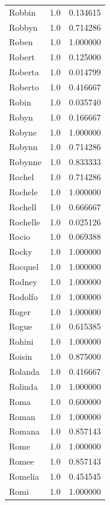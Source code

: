 \documentclass[
  letterpaper,
  DIV=11,
  numbers=noendperiod]{scrreprt}
\begin{document}
\begin{tabular}{lrr}
Robbin          &   1.0 &   0.134615 \\
Robbyn          &   1.0 &   0.714286 \\
Roben           &   1.0 &   1.000000 \\
Robert          &   1.0 &   0.125000 \\
Roberta         &   1.0 &   0.014799 \\
Roberto         &   1.0 &   0.416667 \\
Robin           &   1.0 &   0.035740 \\
Robyn           &   1.0 &   0.166667 \\
Robyne          &   1.0 &   1.000000 \\
Robynn          &   1.0 &   0.714286 \\
Robynne         &   1.0 &   0.833333 \\
Rochel          &   1.0 &   0.714286 \\
Rochele         &   1.0 &   1.000000 \\
Rochell         &   1.0 &   0.666667 \\
Rochelle        &   1.0 &   0.025126 \\
Rocio           &   1.0 &   0.069388 \\
Rocky           &   1.0 &   1.000000 \\
Rocquel         &   1.0 &   1.000000 \\
Rodney          &   1.0 &   1.000000 \\
Rodolfo         &   1.0 &   1.000000 \\
Roger           &   1.0 &   1.000000 \\
Rogue           &   1.0 &   0.615385 \\
Rohini          &   1.0 &   1.000000 \\
Roisin          &   1.0 &   0.875000 \\
Rolanda         &   1.0 &   0.416667 \\
Rolinda         &   1.0 &   1.000000 \\
Roma            &   1.0 &   0.600000 \\
Roman           &   1.0 &   1.000000 \\
Romana          &   1.0 &   0.857143 \\
Rome            &   1.0 &   1.000000 \\
Romee           &   1.0 &   0.857143 \\
Romelia         &   1.0 &   0.454545 \\
Romi            &   1.0 &   1.000000 \\

\end{tabular}
\end{document}
